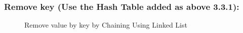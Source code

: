 \subsubsection{Remove key (Use the Hash Table added as above 3.3.1):}
\begin{figure}[H]
	\centering
	\qquad
	\caption{Remove value by key by Chaining Using Linked List}%
\end{figure}

